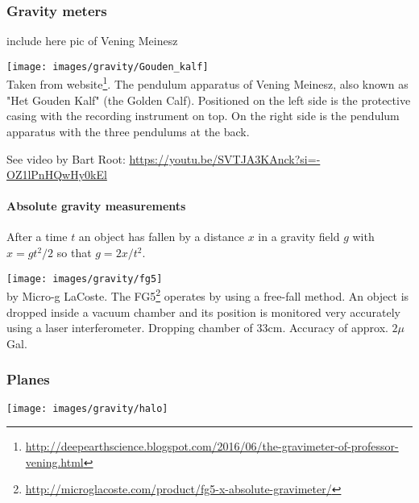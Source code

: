 


\subsubsection{Gravity meters}


include here pic of Vening Meinesz

\begin{center}
\texttt{[image: images/gravity/Gouden\_kalf]}\\
{\captionfont 
Taken from 
website\footnote{\url{http://deepearthscience.blogspot.com/2016/06/the-gravimeter-of-professor-vening.html}}.
The pendulum apparatus of Vening Meinesz, also known as "Het Gouden Kalf" (the Golden Calf). Positioned on the left side is the protective casing with the recording instrument on top. On the right side is the pendulum apparatus with the three pendulums at the back. }
\end{center}

See video by Bart Root: \url{https://youtu.be/SVTJA3KAnck?si=-OZ1lPnHQwHy0kEl}

\paragraph{Absolute gravity measurements}

After a time $t$ an object has fallen by a distance $x$ in a gravity field $g$
with $x=gt^2/2$ so that $g=2x/t^2$.

\begin{center}
\texttt{[image: images/gravity/fg5]}\\
{\captionfont by Micro-g LaCoste. 
The FG5\footnote{\url{http://microglacoste.com/product/fg5-x-absolute-gravimeter/}}
 operates by using a free-fall method. An object is dropped inside a vacuum 
chamber and its position is monitored very accurately using a laser interferometer. 
Dropping chamber of 33cm. Accuracy of approx. $2\mu$Gal.}
\end{center}



\subsubsection{Planes}

\begin{center}
\texttt{[image: images/gravity/halo]}
\end{center}





